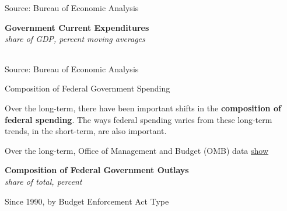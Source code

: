 \documentclass{report}
\newcommand{\tbllink}[1]{\href{https://raw.githubusercontent.com/bdecon/US-chartbook/master/chartbook/data/#1}{\faTable}}
\begin{document}
{\begin{minipage}{0.76\textwidth}
\footnotesize{Source: Bureau of Economic Analysis} \hfill \tbllink{gov_exp_overview.csv}
\vspace{1mm}

\small   
\vspace{1mm}

\normalsize \textbf{Government Current Expenditures}\\
\footnotesize{\textit{share of GDP, percent \hspace{63mm} moving averages}}\\ 
 \setlength{\tabcolsep}{4pt} \color{black!90}
	{\renewcommand{\arraystretch}{1.54}
\hspace{-2mm} \begin{tabular}{p{36mm} R{7mm} R{7mm} R{7mm} R{7mm} R{7mm} |
		   R{7mm} R{7mm} R{7mm} }
			  \hline
		\end{tabular}}\vspace{-2mm}
		
\footnotesize{Source: Bureau of Economic Analysis}
\end{minipage}
\newpage
\vspace*{-10mm}

\begin{minipage}{0.76\textwidth}  
\normalsize Composition of Federal Government Spending
\vspace{-1mm}

\small Over the long-term, there have been important shifts in the \textbf{composition of federal spending}. The ways federal spending varies from these long-term trends, in the short-term, are also important. 

Over the long-term, Office of Management and Budget (OMB) data \href{https://www.whitehouse.gov/omb/historical-tables/}{show} 
\vspace{1mm}

\normalsize \textbf{Composition of Federal Government Outlays}\\
\footnotesize{\textit{share of total, percent}}
\vspace{1mm}

\begin{minipage}{0.58\textwidth}
\small {Since 1990, by Budget Enforcement Act Type}\\
\vspace{5.0cm}


\end{minipage}
\end{minipage}}
\end{document}
